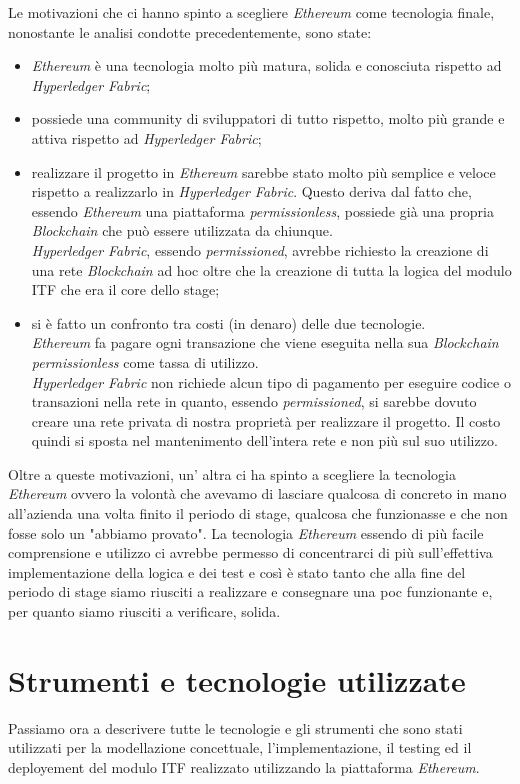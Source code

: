 Le motivazioni che ci hanno spinto a scegliere \textit{Ethereum} come tecnologia finale, nonostante le analisi condotte precedentemente, sono state:
\begin{itemize}
	\item \textit{Ethereum} è una tecnologia molto più matura, solida e conosciuta rispetto ad \textit{Hyperledger Fabric};
	\item possiede una community di sviluppatori di tutto rispetto, molto più grande e attiva rispetto ad \textit{Hyperledger Fabric};
	\item realizzare il progetto in \textit{Ethereum} sarebbe stato molto più semplice e veloce rispetto a realizzarlo in \textit{Hyperledger Fabric}. Questo deriva dal fatto che, essendo \textit{Ethereum} una piattaforma \textit{permissionless}, possiede già una propria \textit{Blockchain} che può essere utilizzata da chiunque.\\
	\textit{Hyperledger Fabric}, essendo \textit{permissioned}, avrebbe richiesto la creazione di una rete \textit{Blockchain} ad hoc oltre che la creazione di tutta la logica del modulo \gls{ITF} che era il core dello stage;
	\item si è fatto un confronto tra costi (in denaro) delle due tecnologie.\\
	\textit{Ethereum} fa pagare ogni transazione che viene eseguita nella sua \textit{Blockchain permissionless} come tassa di utilizzo.\\
	\textit{Hyperledger Fabric} non richiede alcun tipo di pagamento per eseguire codice o transazioni nella rete in quanto, essendo \textit{permissioned}, si sarebbe dovuto creare una rete privata di nostra proprietà per realizzare il progetto. Il costo quindi si sposta nel mantenimento dell'intera rete e non più sul suo utilizzo.
\end{itemize}
Oltre a queste motivazioni, un' altra ci ha spinto a scegliere la tecnologia \textit{Ethereum} ovvero la volontà che avevamo di lasciare qualcosa di concreto in mano all'azienda una volta finito il periodo di stage, qualcosa che funzionasse e che non fosse solo un "abbiamo provato". La tecnologia \textit{Ethereum} essendo di più facile comprensione e utilizzo ci avrebbe permesso di concentrarci di più sull'effettiva implementazione della logica e dei test e così è stato tanto che alla fine del periodo di stage siamo riusciti a realizzare e consegnare una \gls{poc} funzionante e, per quanto siamo riusciti a verificare, solida.

\section{Strumenti e tecnologie utilizzate}
Passiamo ora a descrivere tutte le tecnologie e gli strumenti che sono stati utilizzati per la modellazione concettuale, l'implementazione, il testing ed il deployement del modulo \gls{ITF} realizzato utilizzando la piattaforma \textit{Ethereum}.

